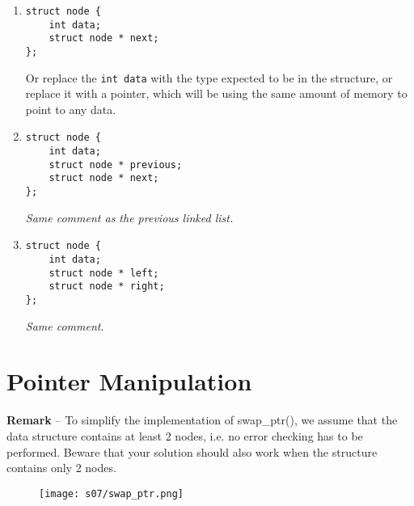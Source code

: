 \begin{enumerate}[label={\questioncolor\arabic*.}]
    \item {}

\begin{lstlisting}
struct node {
    int data;
    struct node * next;
};
\end{lstlisting}

    Or replace the \verb!int data! with the type expected to be in the structure, or replace it with a pointer, which will be using the same amount of memory to point to any data.


    \item {}

\begin{lstlisting}
struct node {
    int data;
    struct node * previous;
    struct node * next;
};
\end{lstlisting}

    \textit{Same comment as the previous linked list.}

    \item {}

\begin{lstlisting}
struct node {
    int data;
    struct node * left;
    struct node * right;
};
\end{lstlisting}

    \textit{Same comment}.

\end{enumerate}




%
%
\section{Pointer Manipulation}


{\color{gray} \textbf{Remark} -- To simplify the implementation of swap\_ptr(), we
assume that the data structure contains at least 2 nodes, i.e. no error
checking has to be performed. Beware that your solution should also work
when the structure contains only 2 nodes.}


\begin{figure}[H]
    \center
    \texttt{[image: s07/swap\_ptr.png]}
    \label{fig:fig1}
\end{figure}


